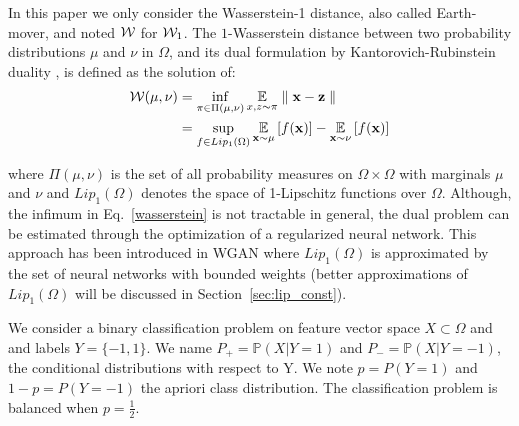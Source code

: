 In this paper we only consider the Wasserstein-1 distance, also called Earth-mover, and noted $\mathcal{W}$ for $\mathcal{W}_1$.
The $1$-Wasserstein distance between two probability distributions $\mu$ and $\nu$ in $\Omega$, and its dual formulation by Kantorovich-Rubinstein duality \cite{villani2008}, is defined as the solution of:
\begin{subequations}

\begin{align}
\mathcal{W}(\mu,\nu) & = \inf_{\pi \in \Pi(\mu,\nu)}\underset{x,z \sim \pi}{\mathbb{E}}\parallel \textbf{x}-\textbf{z} \parallel \label{wasserstein}\\
  & =\sup_{f \in Lip_1(\Omega)} \underset{\textbf{x} \sim \mu}{\mathbb{E}} \left[f(\textbf{x} )\right] -\underset{\textbf{x}  \sim \nu}{\mathbb{E}} \left[f(\textbf{x} )\right] \label{kantorovich}
\end{align}
\end{subequations}

where $\Pi(\mu,\nu)$ is the set of all probability measures on $\Omega\times \Omega$ with marginals $\mu$ and $\nu$ and $Lip_1(\Omega)$ denotes the space of 1-Lipschitz functions over $\Omega$. 
Although, the infimum in Eq.~\eqref{wasserstein} is not tractable in general, the dual problem can be estimated through the optimization of a regularized neural network. This approach has been introduced in WGAN  \cite{Arjovsky2017} where $Lip_1(\Omega)$ is approximated by the set of neural networks with bounded weights (better approximations of $Lip_1(\Omega)$ will be discussed in Section~\ref{sec:lip_const}). 

We consider a binary classification problem on feature vector space $X\subset \Omega$ and and labels $Y= \{-1,1\}$. We name $P_+=\mathbb{P}(X|Y=1)$ and  $P_-=\mathbb{P}(X|Y=-1)$, the conditional distributions with respect to Y. We note $p=P(Y=1)$ and $1-p=P(Y=-1)$ the apriori class distribution. The classification problem is balanced when $p=\frac{1}{2}$.\\


